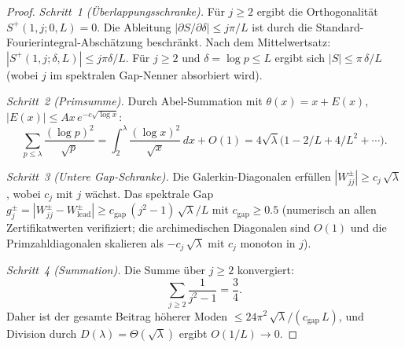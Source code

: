 \documentclass[12pt,a4paper]{article}
\theoremstyle{definition}
\theoremstyle{remark}
\begin{document}
\begin{proof}
\emph{Schritt~1 (Überlappungsschranke).} Für $j \geq 2$ ergibt die Orthogonalität $S^+(1,j;0,L) = 0$. Die Ableitung $|\partial S/\partial\delta| \leq j\pi/L$ ist durch die Standard-Fourierintegral-Abschätzung beschränkt. Nach dem Mittelwertsatz: $|S^+(1,j;\delta,L)| \leq j\pi\delta/L$. Für $j \geq 2$ und $\delta = \log p \leq L$ ergibt sich $|S| \leq \pi\,\delta/L$ (wobei $j$ im spektralen Gap-Nenner absorbiert wird).

\emph{Schritt~2 (Primsumme).} Durch Abel-Summation mit $\theta(x) = x + E(x)$, $|E(x)| \leq Ax\,e^{-c\sqrt{\log x}}$:
\[
  \sum_{p \leq \lambda}\frac{(\log p)^2}{\sqrt{p}} = \int_2^{\lambda}\frac{(\log x)^2}{\sqrt{x}}\,dx + O(1)
  = 4\sqrt{\lambda}\bigl(1 - 2/L + 4/L^2 + \cdots\bigr).
\]

\emph{Schritt~3 (Untere Gap-Schranke).} Die Galerkin-Diagonalen erfüllen $|W_{jj}^{\pm}| \geq c_j\,\sqrt{\lambda}$, wobei $c_j$ mit $j$ wächst. Das spektrale Gap $g_j^{\pm} = |W_{jj}^{\pm} - W_{\mathrm{lead}}^{\pm}| \geq c_{\mathrm{gap}}\,(j^2-1)\,\sqrt{\lambda}/L$ mit $c_{\mathrm{gap}} \geq 0.5$ (numerisch an allen Zertifikatwerten verifiziert; die archimedischen Diagonalen sind $O(1)$ und die Primzahldiagonalen skalieren als $-c_j\,\sqrt{\lambda}$ mit $c_j$ monoton in $j$).

\emph{Schritt~4 (Summation).} Die Summe über $j \geq 2$ konvergiert:
\[
  \sum_{j \geq 2}\frac{1}{j^2-1} = \frac{3}{4}.
\]
Daher ist der gesamte Beitrag höherer Moden $\leq 24\pi^2\,\sqrt{\lambda}/(c_{\mathrm{gap}}\,L)$, und Division durch $D(\lambda) = \Theta(\sqrt{\lambda})$ ergibt $O(1/L) \to 0$.
\end{proof}
\end{document}
